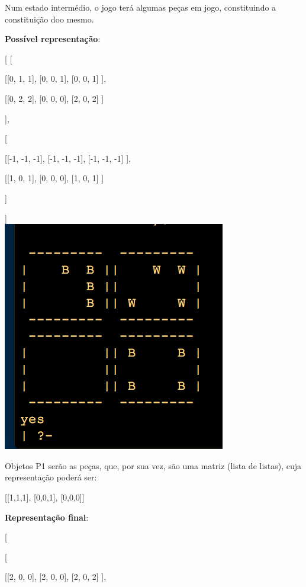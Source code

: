 \documentclass[a4paper]{article}
\begin{document}
Num estado intermédio, o jogo terá algumas peças em jogo, constituindo a constituição doo mesmo.

\textbf{Possível representação}:

	[
		[

		 [[0, 1, 1],
		  [0, 0, 1],
		  [0, 0, 1]
		 ],

		 [[0, 2, 2],
		  [0, 0, 0],
		  [2, 0, 2]
		 ]

		],


		[

		 [[-1, -1, -1],
		  [-1, -1, -1],
		  [-1, -1, -1]
		 ],

		 [[1, 0, 1],
		  [0, 0, 0],
		  [1, 0, 1]
		 ]

		]
		
	]\linebreak\linebreak\\

\includegraphics[scale=0.8]{../printscreens/intermediate_board.png} \linebreak

Objetos P1 serão as peças, que, por sua vez, são uma matriz (lista de listas), cuja representação poderá ser:

[[1,1,1],
[0,0,1],
[0,0,0]]

\textbf{Representação final}:

[


		[

		 [[2, 0, 0],
		  [2, 0, 0],
		  [2, 0, 2]
		 ],
\end{document}
